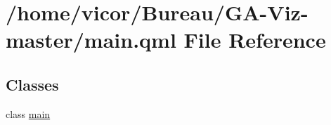 \hypertarget{main_8qml}{}\section{/home/vicor/\+Bureau/\+G\+A-\/\+Viz-\/master/main.qml File Reference}
\label{main_8qml}
\subsection*{Classes}
\begin{DoxyCompactItemize}
\item 
class \hyperlink{classmain}{main}
\end{DoxyCompactItemize}
